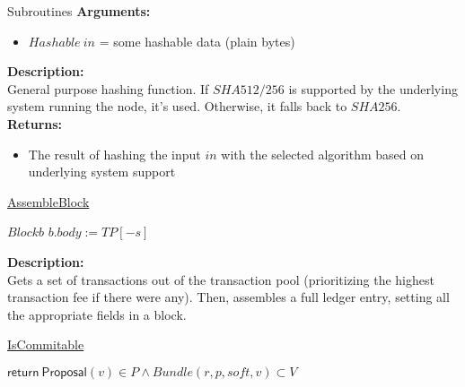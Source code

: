 \documentclass[10pt,a4paper]{article}
\begin{document}
\begin{section}{Subroutines}
\noindent \textbf{Arguments:}
\begin{itemize}
    \item $Hashable \ in$ = some hashable data (plain bytes)
  \end{itemize}

\noindent \textbf{Description:}\\
General purpose hashing function. If $SHA512/256$ is supported by the underlying system running the node, it's used.
Otherwise, it falls back to $SHA256$.\\

\noindent \textbf{Returns:}
\begin{itemize}
    \item The result of hashing the input $in$ with the selected algorithm based on underlying system support
  \end{itemize}


\begin{algorithm}[H]
    \caption{\underline{AssembleBlock}}    
    \label{algo:assemble-block}
    \begin{algorithmic}[1]

    \State $Block b$
    \State $b.body := TP[-s]$

    \EndFunction
    \end{algorithmic}
\end{algorithm}

\noindent \textbf{Description:}\\
Gets a set of transactions out of the transaction pool (prioritizing the highest transaction fee if there were any).
Then, assembles a full ledger entry, setting all the appropriate fields in a block.


\begin{algorithm}[H]
    \caption{\underline{IsCommitable}}
    \label{algo:is-commitable}
    \begin{algorithmic}[1]

    \State $\mathsf{return} \ \mathsf{Proposal}(v) \in P \land Bundle(r,p,soft,v) \subset V$

    \EndFunction
    \end{algorithmic}
\end{algorithm}



\end{section}
\end{document}
